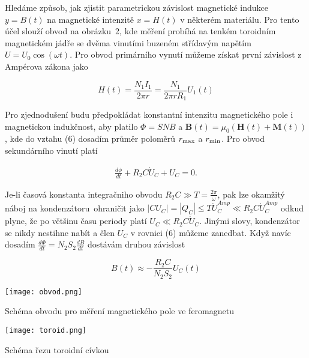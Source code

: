 \documentclass[a4paper,11pt]{article}
\begin{document}
Hledáme způsob, jak zjistit parametrickou závislost magnetické indukce $ y = B(t) $ na magnetické intenzitě $ x = H(t) $ v některém materiálu. Pro tento účel slouží obvod na obrázku~2, kde měření probíhá na tenkém toroidním magnetickém jádře se dvěma vinutími buzeném střídavým napětím $ U = U_0 \cos (\omega t) $. Pro obvod primárního vynutí můžeme získat první závislost z Ampérova zákona jako


\begin{equation}
H(t) = \frac{N_1 I_1}{2 \pi r} = \frac{N_1 }{2 \pi r R_1} U_1(t)
\end{equation}

Pro zjednodušení budu předpokládat konstantní intenzitu magnetického pole i magnetickou indukčnost, aby platilo $ \Phi = S N B  $ a $ \textbf{B}(t) = \mu_0 ( \textbf{H}(t) + \textbf{M}(t) ) $, kde do vztahu (6) dosadím průměr poloměrů $ r_{\rm max} $ a $ r_{\rm min} $. Pro obvod sekundárního vinutí platí


\begin{align}
    \frac{d\phi}{dt} + R_2C\dot{U}_C + U_C = 0.
\end{align}

Je-li časová konstanta integračniho obvodu $ R_2C \gg T = \frac{2\pi}{\omega} $, pak lze okamžitý náboj na kondenzátoru~ohraničit jako $| C U_C | = | Q_C | \le  T \dot{U}_{C}^{Amp} \ll R_2C \dot{U}_{C}^{Amp}$ odkud plyne, že po většinu času periody platí $ U_C \ll R_2C \dot{U}_C $. Jinými slovy, kondenzátor se nikdy nestihne nabít a člen $ U_C $ v rovnici (6) můžeme zanedbat. Když navíc dosadím $ \frac{d \Phi}{dt} = N_2 S_2 \frac{dB}{dt} $ dostávám druhou závislost


\begin{equation}
B(t) \approx - \frac{R_2C}{N_2 S_2} U_C(t)
\end{equation}


\begin{table}[htpb]
    \vspace{-10pt}
    \hfill
    \begin{minipage}[b]{.50\textwidth}
    \centering
    \texttt{[image: obvod.png]}
    \captionsetup{type=figure}
    \caption{Schéma obvodu pro měření magnetického pole ve feromagnetu}
    \end{minipage}
    \hfill
    \vspace{-40pt}
    \begin{minipage}[b]{.23\textwidth}
        \centering
        \texttt{[image: toroid.png]}
        \captionsetup{type=figure}
        \caption{Schéma řezu toroidní cívkou}
    \end{minipage}
    \hfill
    \hfill
\end{table}
\end{document}
